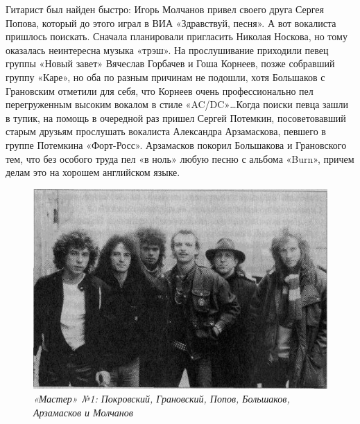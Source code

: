 \documentclass[16pt,a5paper,oneside]{book}
\begin{document}
Гитарист был найден быстро: Игорь Молчанов привел своего друга Сергея Попова, который до этого играл в ВИА «Здравствуй,
песня». А вот вокалиста пришлось поискать. Сначала планировали пригласить Николая Носкова, но тому оказалась неинтересна
музыка «трэш». На прослушивание приходили певец группы «Новый завет» Вячеслав Горбачев и Гоша Корнеев, позже собравший
группу «Каре», но оба по разным причинам не подошли, хотя Большаков с Грановским отметили для себя, что Корнеев очень
профессионально пел перегруженным высоким вокалом в стиле «AC/DC»\ldots Когда поиски певца зашли в тупик, на помощь в
очередной раз пришел Сергей Потемкин, посоветовавший старым друзьям прослушать вокалиста Александра Арзамаскова, певшего
в группе Потемкина «Форт-Росс». Арзамасков покорил Большакова и Грановского тем, что без особого труда пел «в ноль»
любую песню с альбома «Burn», причем делам это на хорошем английском языке.

\begin{figure}
    \centering
    \includegraphics[scale=0.8]{Image16}
    \caption{\textit{«Мастер» №1: Покровский, Грановский, Попов, Большаков, Арзамасков и Молчанов}}
\end{figure}
\end{document}
